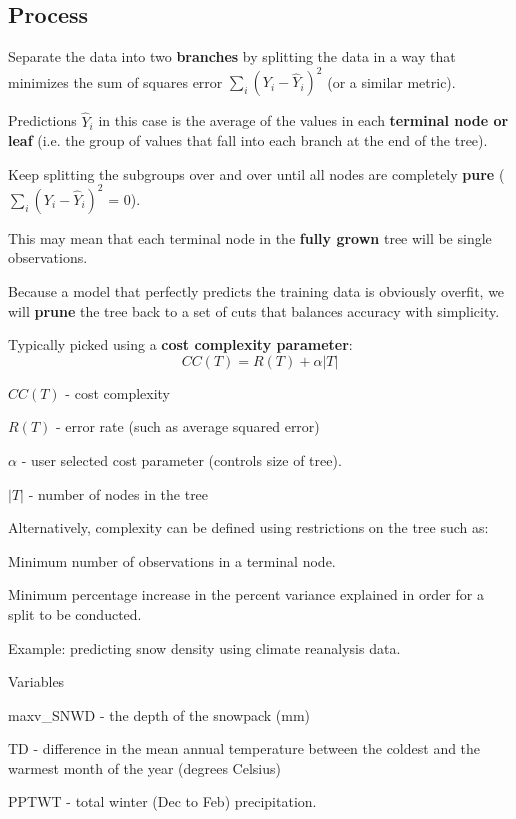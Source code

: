 \documentclass[12pt]{../notes}
\begin{document}
\subsection{Process}
\bi
\item Separate the data into two \textbf{branches} by splitting the data in a way that minimizes the sum of squares error $\sum_i\left(Y_i - \hat{Y}_i\right)^2$ (or a similar metric). 
\bi
\item Predictions $\hat{Y}_i$ in this case is the average of the values in each \textbf{terminal node or leaf} (i.e. the group of values that fall into each branch at the end of the tree).  
\ei
\item Keep splitting the subgroups over and over until all nodes are completely \textbf{pure} ($\sum_i\left(Y_i - \hat{Y}_i\right)^2$ = 0). 
\bi
\item This may mean that each terminal node in the \textbf{fully grown} tree will be single observations. 
\ei
\item Because a model that perfectly predicts the training data is obviously overfit, we will \textbf{prune} the tree back to a set of cuts that balances accuracy with simplicity. 
\bi
\item Typically picked using a \textbf{cost complexity parameter}:
$$CC(T) = R(T) + \alpha|T|$$
\bi
\item $CC(T)$ - cost complexity
\item $R(T)$ - error rate (such as average squared error)
\item $\alpha$ - user selected cost parameter (controls size of tree). 
\item $|T|$ - number of nodes in the tree
\ei
\item Alternatively, complexity can be defined using restrictions on the tree such as:
\bi
\item Minimum number of observations in a terminal node. 
\item Minimum percentage increase in the percent variance explained in order for a split to be conducted. 
\ei
\ei
\ei

Example: predicting snow density using climate reanalysis data. 

Variables
\bi
\item maxv\_SNWD - the depth of the snowpack (mm)
\item TD - difference in the mean annual temperature between the coldest and the warmest month of the year (degrees Celsius)
\item PPTWT - total winter (Dec to Feb) precipitation. 
\ei
\end{document}

